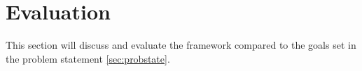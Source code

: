 \section{Evaluation}

This section will discuss and evaluate the framework compared to the goals set in the problem statement \ref{sec:probstate}. 



